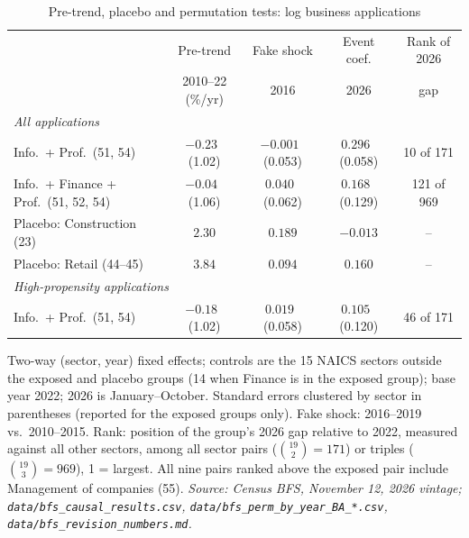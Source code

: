 \begin{table}[t]
  \centering
  \caption{Pre-trend, placebo and permutation tests: log business applications}
  \label{tab:bfs-tests}
  \footnotesize
  \setlength{\tabcolsep}{4pt}
  \begin{tabular}{lcccc}
    \toprule
     & Pre-trend & Fake shock & Event coef. & Rank of 2026 \\
     & 2010--22 (\%/yr) & 2016 & 2026 & gap \\
    \midrule
    \multicolumn{5}{l}{\textit{All applications}} \\
    Info.\ + Prof.\ (51, 54) & $-0.23$ \, (1.02) & $-0.001$ \, (0.053) & $0.296$ \, (0.058) & 10 of 171 \\
    Info.\ + Finance + Prof.\ (51, 52, 54) & $-0.04$ \, (1.06) & $0.040$ \, (0.062) & $0.168$ \, (0.129) & 121 of 969 \\
    Placebo: Construction (23)          & $2.30$           & $0.189$              & $-0.013$              & -- \\
    Placebo: Retail (44--45)            & $3.84$           & $0.094$              & $0.160$              & -- \\
    \multicolumn{5}{l}{\textit{High-propensity applications}} \\
    Info.\ + Prof.\ (51, 54) & $-0.18$ \, (1.02) & $0.019$ \, (0.058)  & $0.105$ \, (0.120)  & 46 of 171 \\
    \bottomrule
  \end{tabular}
  \par\smallskip
  \parbox{\linewidth}{\footnotesize Two-way (sector, year) fixed effects; controls are the 15 NAICS sectors outside the exposed and placebo groups (14 when Finance is in the exposed group); base year 2022; 2026 is January--October.
    Standard errors clustered by sector in parentheses (reported for the exposed groups only).
    Fake shock: 2016--2019 vs.\ 2010--2015.
    Rank: position of the group's 2026 gap relative to 2022, measured against all other sectors, among all sector pairs ($\binom{19}{2} = 171$) or triples ($\binom{19}{3} = 969$), 1 = largest.
    All nine pairs ranked above the exposed pair include Management of companies (55).
    \textit{Source: Census BFS, November 12, 2026 vintage; \texttt{data/bfs\_causal\_results.csv}, \texttt{data/bfs\_perm\_by\_year\_BA\_*.csv}, \texttt{data/bfs\_revision\_numbers.md}.}}
\end{table}
